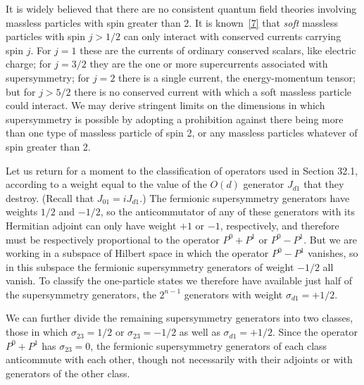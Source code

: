 It is widely believed that there are no consistent quantum field theories
involving massless particles with spin greater than 2. It is
known~\hyperref[ch32-ref-7]{[7]} that \emph{soft} massless particles with
spin \(j>1/2\) can only interact with conserved currents carrying spin
\(j\). For \(j=1\) these are the currents of ordinary conserved scalars,
like electric charge; for \(j=3/2\) they are the one or more supercurrents
associated with supersymmetry; for \(j=2\) there is a single current, the
energy-momentum tensor; but for \(j>5/2\) there is no conserved current
with which a soft massless particle could interact. We may derive
stringent limits on the dimensions in which supersymmetry is possible by
adopting a prohibition against there being more than one type of massless
particle of spin 2, or any massless particles whatever of spin greater
than 2.

Let us return for a moment to the classification of operators used in
Section 32.1, according to a weight equal to the value of the \(O(d)\)
generator \(J_{d1}\) that they destroy. (Recall that
\(J_{01}=iJ_{d1}\).) The fermionic supersymmetry generators have weights
\(1/2\) and \(-1/2\), so the anticommutator of any of these generators
with its Hermitian adjoint can only have weight \(+1\) or \(-1\),
respectively, and therefore must be respectively proportional to the
operator \(P^0+P^1\) or \(P^0-P^1\). But we are working in a subspace of
Hilbert space in which the operator \(P^0-P^1\) vanishes, so in this
subspace the fermionic supersymmetry generators of weight \(-1/2\) all
vanish. To classify the one-particle states we therefore have available
just half of the supersymmetry generators, the \(2^{n-1}\) generators with
weight \(\sigma_{d1}=+1/2\).

We can further divide the remaining supersymmetry generators into two
classes, those in which \(\sigma_{23}=1/2\) or
\(\sigma_{23}=-1/2\) as well as \(\sigma_{d1}=+1/2\). Since the operator
\(P^0+P^1\) has \(\sigma_{23}=0\), the fermionic supersymmetry generators
of each class anticommute with each other, though not necessarily with
their adjoints or with generators of the other class.

